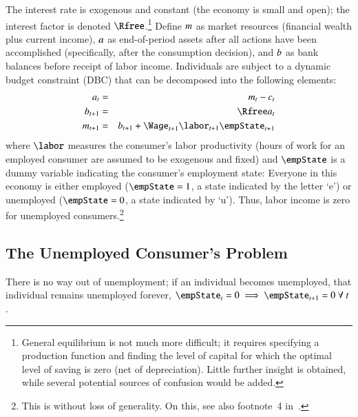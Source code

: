 \documentclass[titlepage,abstract]{\econtex}\newcommand{\texname}{ctDiscrete}
\begin{document}
The interest rate is exogenous and constant (the economy is small and open); the interest factor is denoted $\Rfree$.\footnote{General equilibrium is not much more difficult; it requires specifying a production function and finding the level of capital for which the optimal level of saving is zero (net of depreciation).  Little further insight is obtained, while several potential sources of confusion would be added.}
Define $m$ as market resources (financial wealth plus current income), $a$ as end-of-period assets after all actions have been accomplished (specifically, after the consumption decision), and $b$ as bank balances before receipt of labor income. Individuals are subject to a dynamic budget constraint (DBC) that can be decomposed into the following elements:
\begin{eqnarray}
    \aLev_{t} & = & \mLev_{t}-\cLev_{t}
\\  \bLev_{t+1} & = & \Rfree \aLev_{t}
\\  \mLev_{t+1} & = & \bLev_{t+1}+\Wage_{t+1}\labor_{t+1}\empState_{t+1}  \label{eq:DBC}
\end{eqnarray}
where $\labor$ measures the consumer's labor productivity (hours of
work for an employed consumer are assumed to be exogenous and fixed)
and $\empState$ is a dummy variable indicating the consumer's
employment state: Everyone in this economy is either employed
($\empState = 1$, a state indicated by the letter `e') or unemployed
($\empState=0$, a state indicated by `u'). Thus, labor income is zero
for unemployed consumers.\footnote{This is without loss of generality.  On
  this, see also footnote~4 in~\cite{toche:urisk}.}



\subsection{The Unemployed Consumer's Problem}
There is no way out of unemployment; if an individual becomes
unemployed, that individual remains unemployed forever,
$\empState_{t}=0 \implies \empState_{t+1}=0~\forall~t$.  
\end{document}
